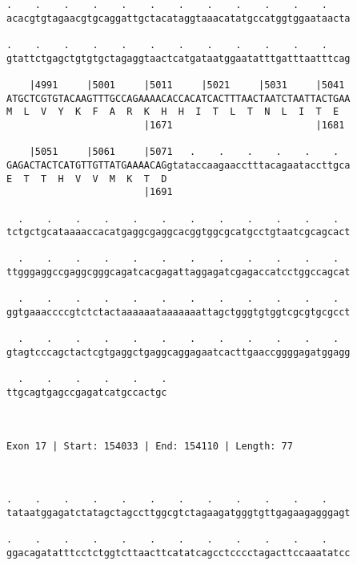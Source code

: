 \documentclass{article}
\begin{document}
\begin{Verbatim}
.    .    .    .    .    .    .    .    .    .    .    .    
acacgtgtagaacgtgcaggattgctacataggtaaacatatgccatggtggaataacta
                                                            
.    .    .    .    .    .    .    .    .    .    .    .    
gtattctgagctgtgtgctagaggtaactcatgataatggaatatttgatttaatttcag
                                                            
    |4991     |5001     |5011     |5021     |5031     |5041 
ATGCTCGTGTACAAGTTTGCCAGAAAACACCACATCACTTTAACTAATCTAATTACTGAA
M  L  V  Y  K  F  A  R  K  H  H  I  T  L  T  N  L  I  T  E  
                        |1671                         |1681 
  
    |5051     |5061     |5071   .    .    .    .    .    .  
GAGACTACTCATGTTGTTATGAAAACAGgtataccaagaacctttacagaataccttgca
E  T  T  H  V  V  M  K  T  D                                
                        |1691                               
  
  .    .    .    .    .    .    .    .    .    .    .    .  
tctgctgcataaaaccacatgaggcgaggcacggtggcgcatgcctgtaatcgcagcact
                                                            
  .    .    .    .    .    .    .    .    .    .    .    .  
ttgggaggccgaggcgggcagatcacgagattaggagatcgagaccatcctggccagcat
                                                            
  .    .    .    .    .    .    .    .    .    .    .    .  
ggtgaaaccccgtctctactaaaaaataaaaaaattagctgggtgtggtcgcgtgcgcct
                                                            
  .    .    .    .    .    .    .    .    .    .    .    .  
gtagtcccagctactcgtgaggctgaggcaggagaatcacttgaaccggggagatggagg
                                                            
  .    .    .    .    .    .
ttgcagtgagccgagatcatgccactgc
                            
                            
 
Exon 17 | Start: 154033 | End: 154110 | Length: 77



.    .    .    .    .    .    .    .    .    .    .    .    
tataatggagatctatagctagccttggcgtctagaagatgggtgttgagaagagggagt
                                                            
.    .    .    .    .    .    .    .    .    .    .    .    
ggacagatatttcctctggtcttaacttcatatcagcctcccctagacttccaaatatcc
                                                            

\end{Verbatim}
\end{document}
